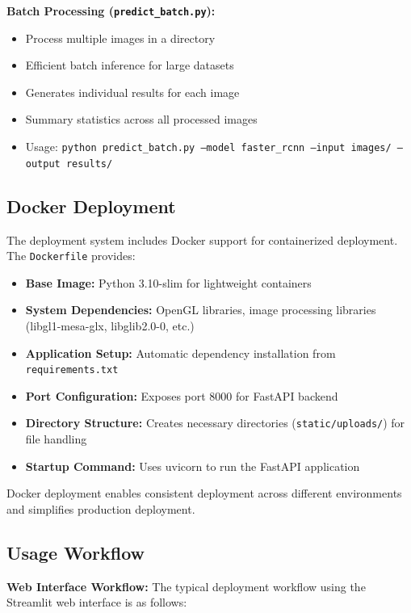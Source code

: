 \documentclass[12pt,a4paper]{article}
\begin{document}
\textbf{Batch Processing (\texttt{predict\_batch.py}):}
\begin{itemize}
    \item Process multiple images in a directory
    \item Efficient batch inference for large datasets
    \item Generates individual results for each image
    \item Summary statistics across all processed images
    \item Usage: \texttt{python predict\_batch.py --model faster\_rcnn --input images/ --output results/}
\end{itemize}

\subsection{Docker Deployment}

The deployment system includes Docker support for containerized deployment. The \texttt{Dockerfile} provides:

\begin{itemize}
    \item \textbf{Base Image:} Python 3.10-slim for lightweight containers
    \item \textbf{System Dependencies:} OpenGL libraries, image processing libraries (libgl1-mesa-glx, libglib2.0-0, etc.)
    \item \textbf{Application Setup:} Automatic dependency installation from \texttt{requirements.txt}
    \item \textbf{Port Configuration:} Exposes port 8000 for FastAPI backend
    \item \textbf{Directory Structure:} Creates necessary directories (\texttt{static/uploads/}) for file handling
    \item \textbf{Startup Command:} Uses uvicorn to run the FastAPI application
\end{itemize}

Docker deployment enables consistent deployment across different environments and simplifies production deployment.

\subsection{Usage Workflow}

\textbf{Web Interface Workflow:}
The typical deployment workflow using the Streamlit web interface is as follows:
\end{document}
